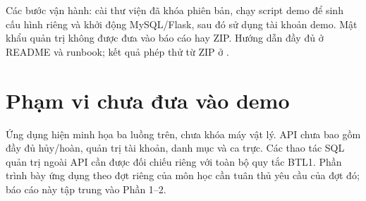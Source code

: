 Các bước vận hành: cài thư viện đã khóa phiên bản, chạy script demo để sinh cấu hình riêng và khởi động MySQL/Flask, sau đó sử dụng tài khoản demo. Mật khẩu quản trị không được đưa vào báo cáo hay ZIP. Hướng dẫn đầy đủ ở README và runbook; kết quả phép thử từ ZIP ở .
\section{Phạm vi chưa đưa vào demo}
Ứng dụng hiện minh họa ba luồng trên, chưa khóa máy vật lý. API chưa bao gồm đầy đủ hủy/hoàn, quản trị tài khoản, danh mục và ca trực. Các thao tác SQL quản trị ngoài API cần được đối chiếu riêng với toàn bộ quy tắc BTL1. Phần trình bày ứng dụng theo đợt riêng của môn học cần tuân thủ yêu cầu của đợt đó; báo cáo này tập trung vào Phần 1–2.
